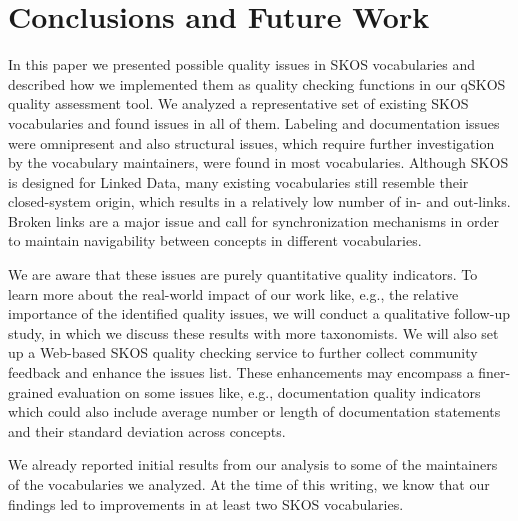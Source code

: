 \section{Conclusions and Future Work}\label{sec:conclusions}

In this paper we presented possible quality issues in SKOS vocabularies and described how we implemented them as quality checking functions in our qSKOS quality assessment tool. We analyzed a representative set of existing SKOS vocabularies and found  issues in all of them. Labeling and documentation issues were omnipresent and also structural issues, which require further investigation by the vocabulary maintainers, were found in most vocabularies. Although SKOS is designed for Linked Data, many existing vocabularies still resemble their closed-system origin, which results in a relatively low number of in- and out-links. Broken links are a major issue and call for synchronization mechanisms in order to maintain navigability between concepts in different vocabularies.

We are aware that these issues are purely quantitative quality indicators. To learn more about the real-world impact of our work like, e.g., the relative importance of the identified quality issues, we will conduct a qualitative follow-up study, in which we discuss these results with more taxonomists. We will also set up a Web-based SKOS quality checking service to further collect community feedback and enhance the issues list. These enhancements may encompass a finer-grained evaluation on some issues like, e.g., documentation quality indicators which could also include average number or length of documentation statements and their standard deviation across concepts.

We already reported initial results from our analysis to some of the maintainers of the vocabularies we analyzed. At the time of this writing, we know that our findings led to improvements in at least two SKOS vocabularies.

